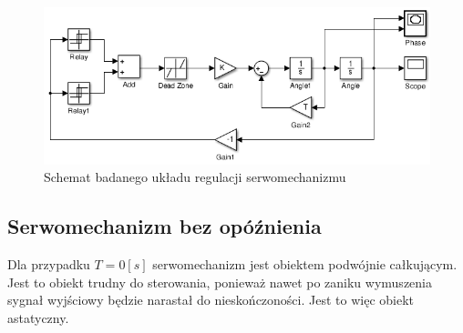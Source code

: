 \documentclass[12pt]{article}
\begin{document}
\begin{figure}[!htb]
	\begin{center}
		\includegraphics[width=14cm]{../res/img/schs1.png} 
	\end{center}
	\caption{Schemat badanego układu regulacji serwomechanizmu}
\end{figure}

\newpage

\subsection{Serwomechanizm bez opóźnienia}

Dla przypadku $T=0[s]$ serwomechanizm jest obiektem podwójnie całkującym. Jest
to obiekt trudny do sterowania, ponieważ nawet po zaniku wymuszenia sygnał
wyjściowy będzie narastał do nieskończoności. Jest to więc obiekt astatyczny.
\end{document}
